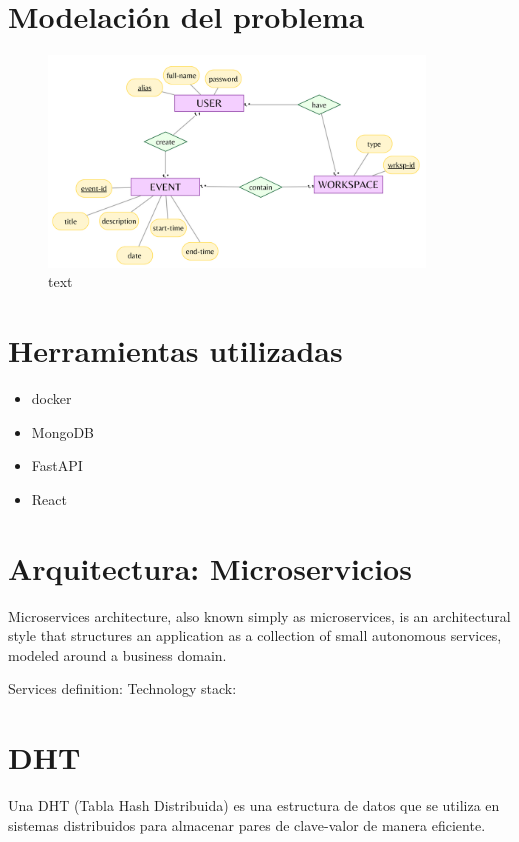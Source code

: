\documentclass[10pt]{article} %
\begin{document}
	\section{Modelaci\'on del problema}
	
	\begin{figure}[H]
		\centering
		\includegraphics[width=10cm]{merx.png}
		\caption{text}
	\end{figure}
	
	\section{Herramientas utilizadas}
	
	\begin{itemize}
		\item docker
		\item MongoDB
		\item FastAPI
		\item React
	\end{itemize}
	
	\section{Arquitectura: Microservicios}
	
	Microservices architecture, also known simply as microservices, is an architectural style that structures an application as a collection of small autonomous services, modeled around a business domain.
	
	Services definition:
	Technology stack:
	
	\section{DHT}
	
	Una DHT (Tabla Hash Distribuida) es una estructura de datos que se utiliza en sistemas distribuidos para almacenar pares de clave-valor de manera eficiente.
	
\end{document}

